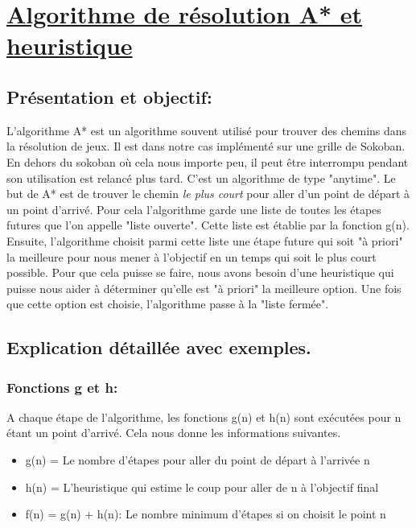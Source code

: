 \documentclass{article}
\begin{document}
\newpage

\section{\underline{ Algorithme de résolution A* et heuristique}}
	
\vspace{1.5 cm}


\subsection{Présentation et objectif:}
L'algorithme A* est un algorithme souvent utilisé pour trouver des chemins dans la résolution de jeux. Il est dans notre cas implémenté sur une grille de Sokoban. En dehors du sokoban où cela nous importe peu, il peut être interrompu pendant son utilisation est relancé plus tard. C'est un algorithme de type "anytime".
Le but de A* est de trouver le chemin \textit{le plus court} pour aller d'un point de départ à un point d'arrivé. Pour cela l'algorithme garde une liste de toutes les étapes futures que l'on appelle "liste ouverte". Cette liste est établie par la fonction g(n). Ensuite, l'algorithme choisit parmi cette liste une étape future qui soit "à priori" la meilleure pour nous mener à l'objectif en un temps qui soit le plus court possible. Pour que cela puisse se faire, nous avons besoin d'une heuristique qui puisse nous aider à déterminer qu'elle est "à priori" la meilleure option. Une fois que cette option est choisie, l'algorithme passe à la "liste fermée". 
\subsection{Explication détaillée avec exemples.}
\subsubsection{Fonctions g et h:}
A chaque étape de l'algorithme, les fonctions g(n) et h(n) sont exécutées pour n étant un point d'arrivé. Cela nous donne les informations suivantes.
\begin{itemize}
\item g(n) = Le nombre d'étapes pour aller du point de départ à l'arrivée n
\item h(n) = L'heuristique qui estime le coup pour aller de n à l'objectif final
\item f(n) = g(n) + h(n): Le nombre minimum d'étapes si on choisit le point n
\end{itemize}
\end{document}
